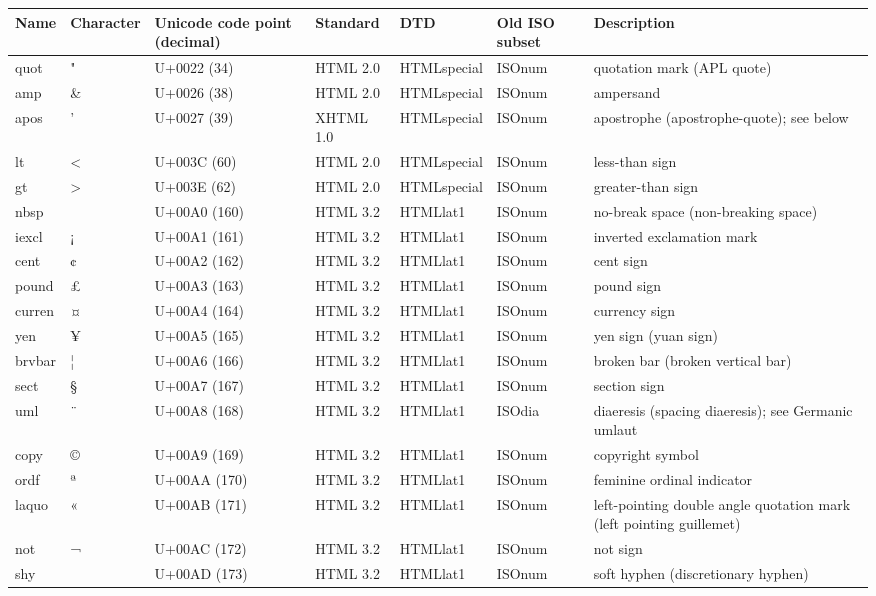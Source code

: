 \documentclass{article}
\begin{document}
\begin{tabular}{lllllll}
\toprule
Name & Character & Unicode code point (decimal) & Standard & DTD & Old ISO subset & Description \\
\midrule
quot & " & U+0022 (34) & HTML 2.0 & HTMLspecial & ISOnum & quotation mark (APL quote) \\
amp & \& & U+0026 (38) & HTML 2.0 & HTMLspecial & ISOnum & ampersand \\
apos & ' & U+0027 (39) & XHTML 1.0 & HTMLspecial & ISOnum & apostrophe (apostrophe-quote); see below \\
lt & < & U+003C (60) & HTML 2.0 & HTMLspecial & ISOnum & less-than sign \\
gt & > & U+003E (62) & HTML 2.0 & HTMLspecial & ISOnum & greater-than sign \\
nbsp &  & U+00A0 (160) & HTML 3.2 & HTMLlat1 & ISOnum & no-break space (non-breaking space) \\
iexcl & ¡ & U+00A1 (161) & HTML 3.2 & HTMLlat1 & ISOnum & inverted exclamation mark \\
cent & ¢ & U+00A2 (162) & HTML 3.2 & HTMLlat1 & ISOnum & cent sign \\
pound & £ & U+00A3 (163) & HTML 3.2 & HTMLlat1 & ISOnum & pound sign \\
curren & ¤ & U+00A4 (164) & HTML 3.2 & HTMLlat1 & ISOnum & currency sign \\
yen & ¥ & U+00A5 (165) & HTML 3.2 & HTMLlat1 & ISOnum & yen sign (yuan sign) \\
brvbar & ¦ & U+00A6 (166) & HTML 3.2 & HTMLlat1 & ISOnum & broken bar (broken vertical bar) \\
sect & § & U+00A7 (167) & HTML 3.2 & HTMLlat1 & ISOnum & section sign \\
uml & ¨ & U+00A8 (168) & HTML 3.2 & HTMLlat1 & ISOdia & diaeresis (spacing diaeresis); see Germanic umlaut \\
copy & © & U+00A9 (169) & HTML 3.2 & HTMLlat1 & ISOnum & copyright symbol \\
ordf & ª & U+00AA (170) & HTML 3.2 & HTMLlat1 & ISOnum & feminine ordinal indicator \\
laquo & « & U+00AB (171) & HTML 3.2 & HTMLlat1 & ISOnum & left-pointing double angle quotation mark (left pointing guillemet) \\
not & ¬ & U+00AC (172) & HTML 3.2 & HTMLlat1 & ISOnum & not sign \\
shy &  & U+00AD (173) & HTML 3.2 & HTMLlat1 & ISOnum & soft hyphen (discretionary hyphen) \\

\end{tabular}
\end{document}
